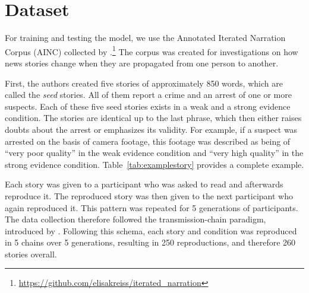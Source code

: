 \documentclass[11pt,a4paper]{article}
\begin{document}

\section{Dataset}
For training and testing the model, we use the Annotated Iterated Narration Corpus (AINC) collected by \citet{Kreiss:2019}.\footnote{\url{https://github.com/elisakreiss/iterated_narration}} The corpus was created for investigations on how news stories change when they are propagated from one person to another.

First, the authors created five stories of approximately 850 words, which are called the \emph{seed} stories. All of them report a crime and an arrest of one or more suspects. Each of these five seed stories exists in a weak and a strong evidence condition. The stories are identical up to the last phrase, which then either raises doubts about the arrest or emphasizes its validity. For example, if a suspect was arrested on the basis of camera footage, this footage was described as being of ``very poor quality'' in the weak evidence condition and ``very high quality'' in the strong evidence condition. Table~\ref{tab:examplestory} provides a complete example.

Each story was given to a participant who was asked to read and afterwards reproduce it. The reproduced story was then given to the next participant who again reproduced it. This pattern was repeated for 5 generations of participants. The data collection therefore followed the transmission-chain paradigm, introduced by \cite{Bartlett:1932}. Following this schema, each story and condition was reproduced in 5 chains over 5 generations, resulting in 250 reproductions, and therefore 260 stories overall. %
\end{document}
